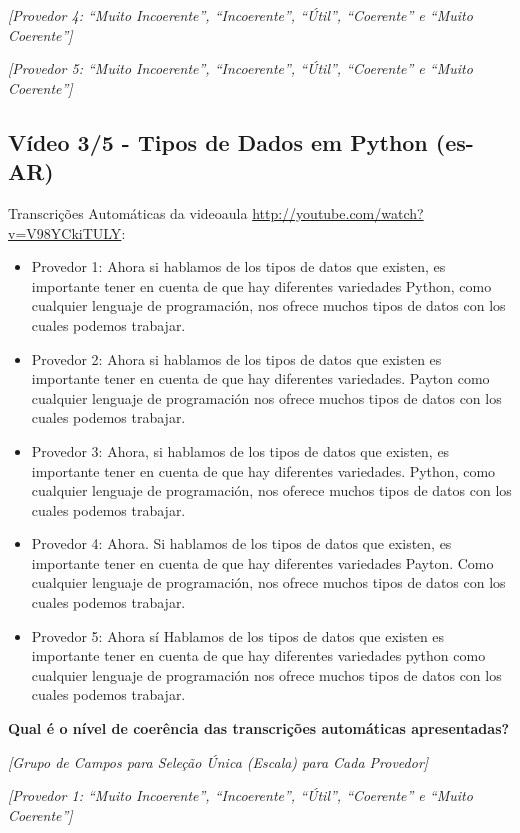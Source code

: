\noindent
\textit{[Provedor 4: ``Muito Incoerente'', ``Incoerente'', ``Útil'', ``Coerente'' e ``Muito Coerente'']}

\noindent
\textit{[Provedor 5: ``Muito Incoerente'', ``Incoerente'', ``Útil'', ``Coerente'' e ``Muito Coerente'']}

\subsection{Vídeo 3/5 - Tipos de Dados em Python (es-AR)}

\noindent
Transcrições Automáticas da videoaula \url{http://youtube.com/watch?v=V98YCkiTULY}:

\begin{itemize}
    \item Provedor 1: Ahora si hablamos de los tipos de datos que existen, es importante tener en cuenta de que hay diferentes variedades Python, como cualquier lenguaje de programación, nos ofrece muchos tipos de datos con los cuales podemos trabajar.
    \item Provedor 2: Ahora si hablamos de los tipos de datos que existen es importante tener en cuenta de que hay diferentes variedades. Payton como cualquier lenguaje de programación nos ofrece muchos tipos de datos con los cuales podemos trabajar.
    \item Provedor 3: Ahora, si hablamos de los tipos de datos que existen, es importante tener en cuenta de que hay diferentes variedades. Python, como cualquier lenguaje de programación, nos oferece muchos tipos de datos con los cuales podemos trabajar.
    \item Provedor 4: Ahora. Si hablamos de los tipos de datos que existen, es importante tener en cuenta de que hay diferentes variedades Payton. Como cualquier lenguaje de programación, nos ofrece muchos tipos de datos con los cuales podemos trabajar.
    \item Provedor 5: Ahora sí Hablamos de los tipos de datos que existen es importante tener en cuenta de que hay diferentes variedades python como cualquier lenguaje de programación nos ofrece muchos tipos de datos con los cuales podemos trabajar.
\end{itemize}

\noindent
\textbf{Qual é o nível de coerência das transcrições automáticas apresentadas?}

\noindent
\textit{[Grupo de Campos para Seleção Única (Escala) para Cada Provedor]}

\noindent
\textit{[Provedor 1: ``Muito Incoerente'', ``Incoerente'', ``Útil'', ``Coerente'' e ``Muito Coerente'']}


